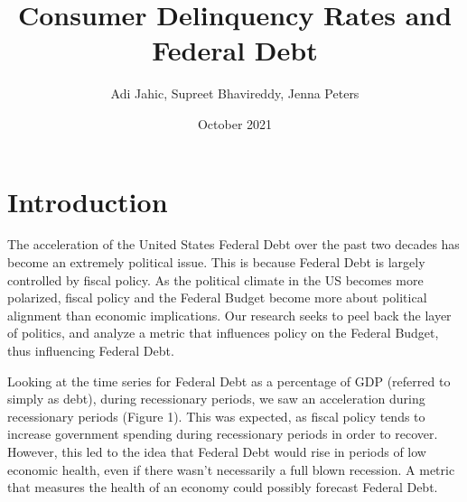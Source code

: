\documentclass[11pt, oneside]{article}   	%
\title{Consumer Delinquency Rates and Federal Debt}
\author{Adi Jahic, Supreet Bhavireddy, Jenna Peters}
\date{October 2021}
\begin{document}
\maketitle	
\section{Introduction}
The acceleration of the United States Federal Debt over the past two decades has become an extremely political issue. This is because Federal Debt is largely controlled by fiscal policy. As the political climate in the US becomes more polarized, fiscal policy and the Federal Budget become more about political alignment than economic implications. Our research seeks to peel back the layer of politics, and analyze a metric that influences policy on the Federal Budget, thus influencing Federal Debt.


Looking at the time series for Federal Debt as a percentage of GDP (referred to simply as debt),  during recessionary periods, we saw an acceleration during recessionary periods (Figure 1). This was expected, as fiscal policy tends to increase government spending during recessionary periods in order to recover. However, this led to the idea that Federal Debt would rise in periods of low economic health, even if there wasn't necessarily a full blown recession. A metric that measures the health of an economy could possibly forecast Federal Debt.
\end{document}
